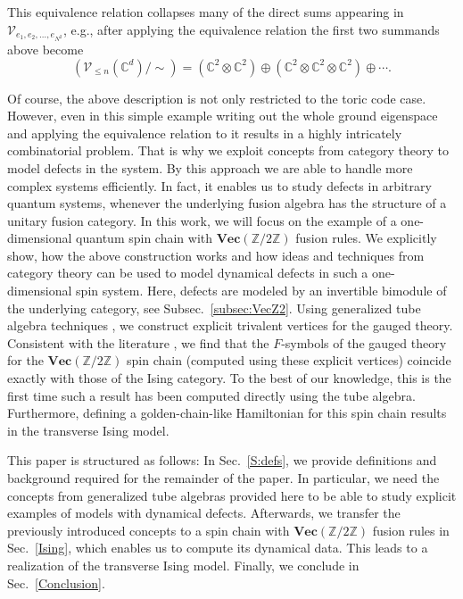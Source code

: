 \documentclass[aps,prb,twocolumn,superscriptaddress,noshowkeys]{revtex4-1}  %
\renewcommand{\Vec}{\textbf{Vec}}
\newcommand{\Z}{\mathbb{Z}}
\theoremstyle{plain}%
\theoremstyle{definition}
\theoremstyle{remark}
\begin{document}
This equivalence relation collapses many of the direct sums appearing in $\mathcal{V}_{e_1,e_2,\ldots,e_{N^2}}$, e.g., after applying the equivalence relation the first two summands above become
\begin{equation}
\left(\mathcal{V}_{\le n}(\mathbb{C}^d)/\sim\right) = (\mathbb{C}^2\otimes \mathbb{C}^2)\oplus (\mathbb{C}^2\otimes \mathbb{C}^2\otimes \mathbb{C}^2)\oplus \cdots.
\end{equation}

Of course, the above description is not only restricted to the toric code case. However, even in this simple example writing out the whole ground eigenspace and applying the equivalence relation to it results in a highly intricately combinatorial problem. That is why we exploit concepts from category theory to model defects in the system. By this approach we are able to handle more complex systems efficiently. In fact, it enables us to study defects in arbitrary quantum systems, whenever the underlying fusion algebra has the structure of a unitary fusion category. In this work, we will focus on the example of a one-dimensional quantum spin chain with $\Vec(\Z/2\Z)$ fusion rules. We explicitly show, how the above construction works and how ideas and techniques from category theory can be used to model dynamical defects in such a one-dimensional spin system. Here, defects are modeled by an invertible bimodule of the underlying category, see Subsec.~\ref{subsec:VecZ2}. Using generalized tube algebra techniques \cite{ocneanu}, we construct explicit trivalent vertices for the gauged theory. Consistent with the literature \cite{TY,ENO10,Bombin2010,BBCW14,WBV17}, we find that the $F$-symbols of the gauged theory for the $\Vec(\Z/2\Z)$ spin chain (computed using these explicit vertices) coincide exactly with those of the Ising category. To the best of our knowledge, this is the first time such a result has been computed directly using the tube algebra. Furthermore, defining a golden-chain-like Hamiltonian \cite{Feiguin2007} for this spin chain results in the transverse Ising model.


This paper is structured as follows: In Sec.~\ref{S:defs}, we provide definitions and background required for the remainder of the paper. In particular, we need the concepts from generalized tube algebras provided here to be able to study explicit examples of models with dynamical defects. Afterwards, we transfer the previously introduced concepts to a spin chain with $\Vec(\Z/2\Z)$ fusion rules in Sec.~\ref{Ising}, which enables us to compute its dynamical data. This leads to a realization of the transverse Ising model. Finally, we conclude in Sec.~\ref{Conclusion}.
\end{document}
